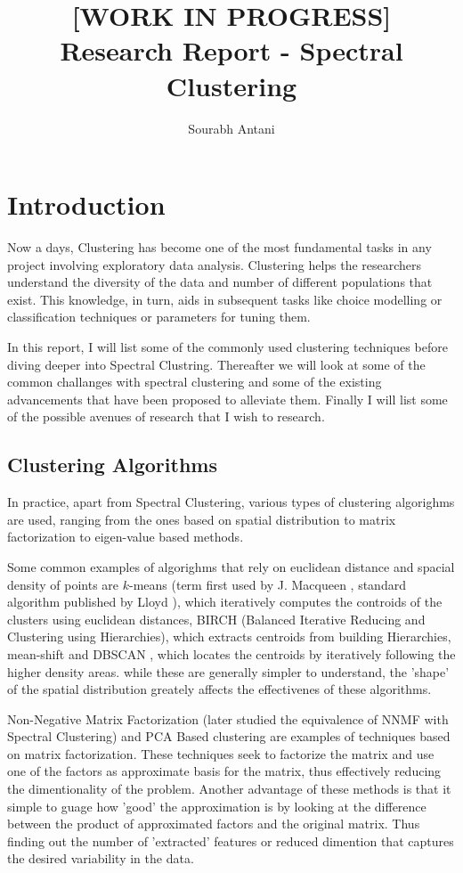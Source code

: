 \documentclass[10pt,a4paper, nocenter]{report}
\author{Sourabh Antani}
\title{[WORK IN PROGRESS] \\ Research Report - Spectral Clustering}
\date{}
\begin{document}
	\maketitle

	
	\chapter{Introduction}
    \thispagestyle{fancy}
    Now a days, Clustering has become one of the most fundamental tasks in any project involving exploratory data analysis. Clustering helps the researchers understand the diversity of the data and number of different populations that exist. This knowledge, in turn, aids in subsequent tasks like choice modelling or classification techniques or parameters for tuning them. 
	
    In this report, I will list some of the commonly used clustering techniques before diving deeper into Spectral Clustring. Thereafter we will look at some of the common challanges with spectral clustering and some of the existing advancements that have been proposed to alleviate them. Finally I will list some of the possible avenues of research that I wish to research. 

    \section*{Clustering Algorithms}
    In practice, apart from Spectral Clustering, various types of clustering algorighms are used, ranging from the ones based on spatial distribution to matrix factorization to eigen-value based methods. 
    
    Some common examples of algorighms that rely on euclidean distance and spacial density of points are $k$-means (term first used by J. Macqueen \cite{Macqueen67kmeans}, standard algorithm published by Lloyd \cite{Lloyd-82-kmeans}), which iteratively computes the controids of the clusters using euclidean distances, BIRCH (Balanced Iterative Reducing and Clustering using Hierarchies)\cite{zhang-96-birch}, which extracts centroids from building Hierarchies, mean-shift\cite{Cheng95meanshift} and DBSCAN \cite{Ester96adensity-based}, which locates the centroids by iteratively following the higher density areas. while these are generally simpler to understand, the 'shape' of the spatial distribution greately affects the effectivenes of these algorithms. 

    Non-Negative Matrix Factorization \cite{Lawton-1971-nnmf} \cite{Paatero1991-nnmf} (later \cite{Ding05-nnmf-spectral} studied the equivalence of NNMF with Spectral Clustering) and PCA Based clustering \cite{Zhang-2108-pca} are examples of techniques based on matrix factorization. These techniques seek to factorize the matrix and use one of the factors as approximate basis for the matrix, thus effectively reducing the dimentionality of the problem. Another advantage of these methods is that it simple to guage how 'good' the approximation is by looking at the difference between the product of approximated factors and the original matrix. Thus finding out the number of 'extracted' features or reduced dimention that captures the desired variability in the data. 
\end{document}
